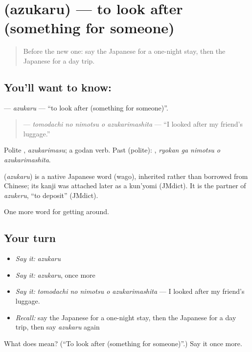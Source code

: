 \section[\texorpdfstring{\ja{あずかる} (azukaru)}{あずかる (azukaru)}]{ (azukaru) — to look after (something for someone)}

\label{lesson:JA-C397-azukaru}



\begin{quote}
Before the new one: say the Japanese for a one-night stay, then the Japanese for a day trip.
\end{quote}

\subsection*{You'll want to know: }
\textbf{} — \emph{azukaru} — \textquotedblleft{}to look after (something for someone)\textquotedblright{}.

\begin{quote}
\textbf{  } — \emph{tomodachi no nimotsu o azukarimashita} — \textquotedblleft{}I looked after my friend's luggage.\textquotedblright{}
\end{quote}

Polite \textbf{}, \emph{azukarimasu}; a godan verb. Past (polite): \textbf{  }, \emph{ryokan ga nimotsu o azukarimashita}.

\begin{cousinweb}
\textbf{} (\emph{azukaru}) is a native Japanese word (wago), inherited rather than borrowed from Chinese; its kanji was attached later as a kun'yomi (JMdict). It is the partner of \emph{azukeru}, \textquotedblleft{}to deposit\textquotedblright{} (JMdict).
\end{cousinweb}

\begin{grammarlens}[title={What you've built}]
One more word for getting around.
\end{grammarlens}

\subsection*{Your turn}
\begin{itemize}
\raggedright
  \item \emph{Say it:} \emph{azukaru}
  \item \emph{Say it:} \emph{azukaru}, once more
  \item \emph{Say it:} \emph{tomodachi no nimotsu o azukarimashita} — I looked after my friend's luggage.
  \item \emph{Recall:} say the Japanese for a one-night stay, then the Japanese for a day trip, then say \emph{azukaru} again
\end{itemize}

\begin{tcolorbox}[breakable,colback=teal!4,colframe=teal!35!black,title={Before you move on}]
What does  mean? (\textquotedblleft{}To look after (something for someone)\textquotedblright{}.) Say it once more.
\end{tcolorbox}
